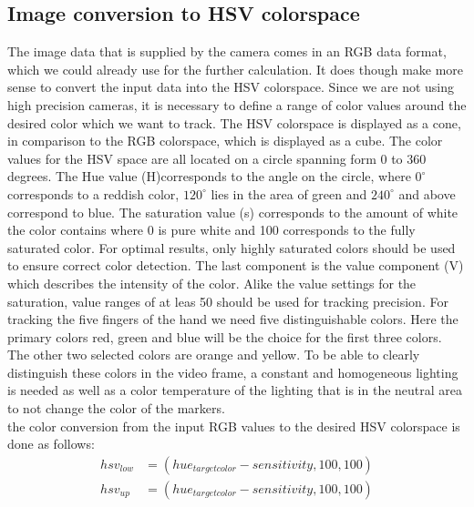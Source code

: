 \subsection{Image conversion to HSV colorspace}
The image data that is supplied by the camera comes in an RGB data format, which we could already use for the further calculation. It does though make more sense to convert the input data into the HSV colorspace. Since we are not using high precision cameras, it is necessary to define a range of color values around the desired color which we want to track. The HSV colorspace is displayed as a cone, in comparison to the RGB colorspace, which is displayed as a cube. The color values for the HSV space are all located on a circle spanning form 0 to 360 degrees. The Hue value (H)corresponds to the angle on the circle, where $0^\circ$ corresponds to a reddish color, $120^\circ$ lies in the area of green and $240^\circ$ and above correspond to blue. The saturation value (s) corresponds to the amount of white the color contains  where 0 is pure white and 100 corresponds to the fully saturated color. For optimal results, only highly saturated colors should be used to ensure correct color detection. The last component is the value component (V) which describes the intensity of the color. Alike the value settings for the saturation, value ranges of at leas 50 should be used for tracking precision.
For tracking the five fingers of the hand we need five distinguishable colors. Here the primary colors red, green and blue will be the choice for the first three colors. The other two selected colors  are orange and yellow. To be able to clearly distinguish these colors in the video frame, a constant and homogeneous lighting is needed as well as a color temperature of the lighting that is in the neutral area to not change the color of the markers.
\\the color conversion from the input RGB values to the desired HSV colorspace is done as follows:
\begin{equation}
\begin{split}
hsv_{low}&=(hue_{targetcolor}-sensitivity,100,100)\\
hsv_{up}&=(hue_{targetcolor}-sensitivity,100,100)\\
\end{split}
\end{equation}
